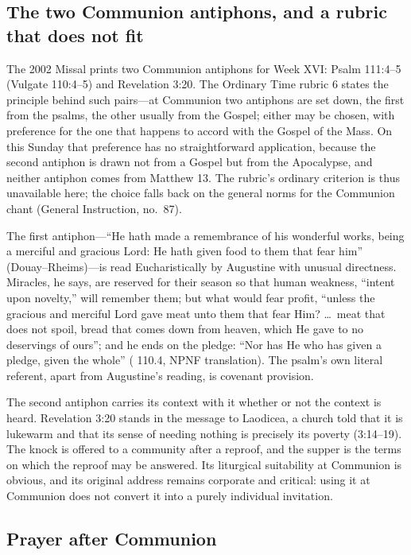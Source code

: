 \subsection*{The two Communion antiphons, and a rubric that does not fit}

The 2002 Missal prints two Communion antiphons for Week XVI: Psalm 111:4--5
(Vulgate 110:4--5) and Revelation 3:20. The Ordinary Time rubric 6 states the
principle behind such pairs---at Communion two antiphons are set down, the
first from the psalms, the other usually from the Gospel; either may be chosen,
with preference for the one that happens to accord with the Gospel of the Mass.
On this Sunday that preference has no straightforward application, because the
second antiphon is drawn not from a Gospel but from the Apocalypse, and neither
antiphon comes from Matthew 13. The rubric's ordinary criterion is thus
unavailable here; the choice falls back on the general norms for the Communion
chant (General Instruction, no.\ 87).

The first antiphon---``He hath made a remembrance of his wonderful works, being
a merciful and gracious Lord: He hath given food to them that fear him''
(Douay--Rheims)---is read Eucharistically by Augustine with unusual directness.
Miracles, he says, are reserved for their season so that human weakness,
``intent upon novelty,'' will remember them; but what would fear profit,
``unless the gracious and merciful Lord gave meat unto them that fear Him?
\dots\ meat that does not spoil, bread that comes down from heaven, which He
gave to no deservings of ours''; and he ends on the pledge:
``Nor has He who has given a pledge, given the whole''
( 110.4, NPNF translation). The psalm's own
literal referent, apart from Augustine's reading, is covenant provision.

The second antiphon carries its context with it whether or not the context is
heard. Revelation 3:20 stands in the message to Laodicea, a church told that it
is lukewarm and that its sense of needing nothing is precisely its poverty
(3:14--19). The knock is offered to a community after a reproof, and the supper
is the terms on which the reproof may be answered. Its liturgical suitability
at Communion is obvious, and its original address remains corporate and
critical: using it at Communion does not convert it into a purely individual
invitation.

\subsection*{Prayer after Communion}

